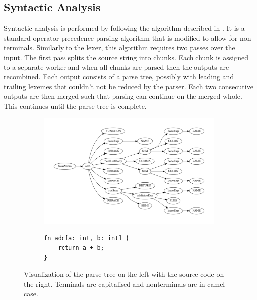 \subsection{Syntactic Analysis}

Syntactic analysis is performed by following the algorithm described in
\cite{barenghi_parallel_2015}. It is a standard  operator precedence parsing algorithm that is
modified to allow for non terminals. Similarly to the lexer, this algorithm requires two passes over
the input. The first pass splits the source string into chunks. Each chunk is assigned to a separate
worker and when all chunks are parsed then the outputs are recombined. Each output consists of a
parse tree, possibly with leading and trailing lexemes that couldn't not be reduced by the parser.
Each two consecutive outputs are then merged such that parsing can continue on the merged whole.
This continues until the parse tree is complete.

\begin{figure}[h]
	\begin{subfigure}[t!]{0.5\textwidth}
	    \centering
	    \includegraphics[width=\textwidth]{images/ptree.png}
	\end{subfigure}
	\begin{subfigure}[t!]{0.5\textwidth}
	\centering
	\begin{verbatim}
fn add[a: int, b: int] {
	return a + b;
}
	\end{verbatim}
	\end{subfigure}%
	\caption{Visualization of the parse tree on the left with the source code on the right. Terminals are capitalised and nonterminals are in camel case.}
	\label{fig:parse_tree}
\end{figure}

